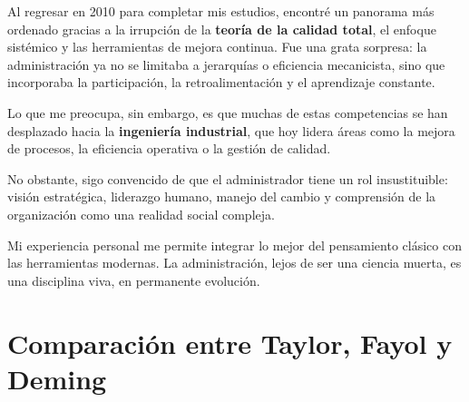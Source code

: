 \documentclass[a4paper,12pt]{article}
\begin{document}
	Al regresar en 2010 para completar mis estudios, encontré un panorama más ordenado gracias a la irrupción de la \textbf{teoría de la calidad total}, el enfoque sistémico y las herramientas de mejora continua. Fue una grata sorpresa: la administración ya no se limitaba a jerarquías o eficiencia mecanicista, sino que incorporaba la participación, la retroalimentación y el aprendizaje constante.
	
	Lo que me preocupa, sin embargo, es que muchas de estas competencias se han desplazado hacia la \textbf{ingeniería industrial}, que hoy lidera áreas como la mejora de procesos, la eficiencia operativa o la gestión de calidad. 
	
	No obstante, sigo convencido de que el administrador tiene un rol insustituible: visión estratégica, liderazgo humano, manejo del cambio y comprensión de la organización como una realidad social compleja. 
	
	Mi experiencia personal me permite integrar lo mejor del pensamiento clásico con las herramientas modernas. La administración, lejos de ser una ciencia muerta, es una disciplina viva, en permanente evolución.
	
	\clearpage
	
	\section*{Comparación entre Taylor, Fayol y Deming}
	
\end{document}
